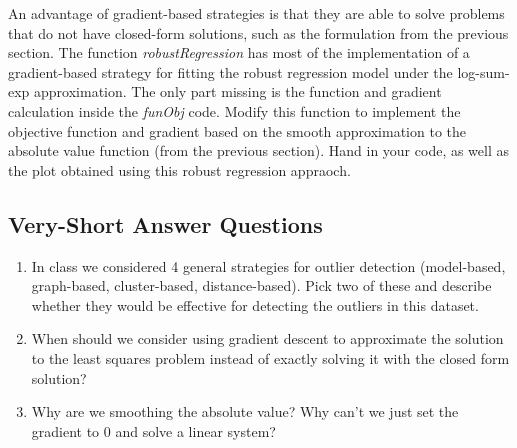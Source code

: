 \documentclass{article}
\def\blu#1{{\color{blu}#1}}
\def\enum#1{\begin{enumerate}#1\end{enumerate}}
\begin{document}
An advantage of gradient-based strategies is that they are able to solve problems that do not have closed-form solutions, such as the formulation from the previous section. The function \emph{robustRegression} has most of the implementation of a gradient-based strategy for fitting the robust regression model under the log-sum-exp approximation. The only part missing is the function and gradient calculation inside the \emph{funObj} code. \blu{Modify this function to implement the objective function and gradient based on the smooth approximation to the absolute value function (from the previous section). Hand in your code, as well as the plot obtained using this robust regression appraoch.}

\subsection{Very-Short Answer Questions}

\blu{
\enum{
\item In class we considered 4 general strategies for outlier detection (model-based, graph-based, cluster-based, distance-based). Pick two of these and describe whether they would be effective for detecting the outliers in this dataset.
\item When should we consider using gradient descent to approximate the solution to the least squares problem instead of exactly solving it with the closed form solution? 
\item Why are we smoothing the absolute value? Why can't we just set the gradient to 0 and solve a linear system?
}}
\end{document}
